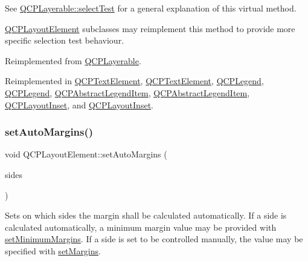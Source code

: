 See \hyperlink{class_q_c_p_layerable_a04db8351fefd44cfdb77958e75c6288e}{Q\+C\+P\+Layerable\+::select\+Test} for a general explanation of this virtual method.

\hyperlink{class_q_c_p_layout_element}{Q\+C\+P\+Layout\+Element} subclasses may reimplement this method to provide more specific selection test behaviour. 

Reimplemented from \hyperlink{class_q_c_p_layerable_a04db8351fefd44cfdb77958e75c6288e}{Q\+C\+P\+Layerable}.



Reimplemented in \hyperlink{class_q_c_p_text_element_a1e721bc2994a127ef5a8f0a514a5dbac}{Q\+C\+P\+Text\+Element}, \hyperlink{class_q_c_p_text_element_a29d2998b50ef369d88ca990b9d3542b3}{Q\+C\+P\+Text\+Element}, \hyperlink{class_q_c_p_legend_aa53507624491908fb3d1a514b1fc674e}{Q\+C\+P\+Legend}, \hyperlink{class_q_c_p_legend_a9dc868bd95069fad9f40718b7715e100}{Q\+C\+P\+Legend}, \hyperlink{class_q_c_p_abstract_legend_item_a80ec112a6608fc39dbed56239849b187}{Q\+C\+P\+Abstract\+Legend\+Item}, \hyperlink{class_q_c_p_abstract_legend_item_a8ca19faad8e2062e945772289a9151bd}{Q\+C\+P\+Abstract\+Legend\+Item}, \hyperlink{class_q_c_p_layout_inset_a2eeef7ea1b8340e7c7c2e2fc229df5ea}{Q\+C\+P\+Layout\+Inset}, and \hyperlink{class_q_c_p_layout_inset_a4bd96dd77545a2b407d24c8bdc276927}{Q\+C\+P\+Layout\+Inset}.

\mbox{\label{class_q_c_p_layout_element_accfda49994e3e6d51ed14504abf9d27d}} 
\subsubsection{\texorpdfstring{set\+Auto\+Margins()}{setAutoMargins()}}
{\footnotesize\ttfamily void Q\+C\+P\+Layout\+Element\+::set\+Auto\+Margins (\begin{DoxyParamCaption}\item[{Q\+C\+P\+::\+Margin\+Sides}]{sides }\end{DoxyParamCaption})}

Sets on which sides the margin shall be calculated automatically. If a side is calculated automatically, a minimum margin value may be provided with \hyperlink{class_q_c_p_layout_element_a0a8a17abc16b7923159fcc7608f94673}{set\+Minimum\+Margins}. If a side is set to be controlled manually, the value may be specified with \hyperlink{class_q_c_p_layout_element_a8f450b1f3f992ad576fce2c63d8b79cf}{set\+Margins}.


